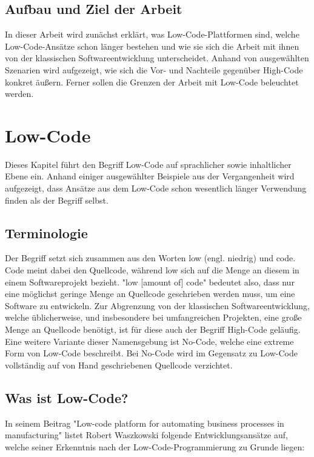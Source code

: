 \documentclass[acmtog, language=ngerman]{acmart}
\begin{document}
\subsection{Aufbau und Ziel der Arbeit}
In dieser Arbeit wird zunächst erklärt, was Low-Code-Plattformen sind, welche Low-Code-Ansätze schon länger bestehen und wie sie sich die Arbeit mit ihnen von der klassischen Softwareentwicklung unterscheidet. Anhand von ausgewählten Szenarien wird aufgezeigt, wie sich die Vor- und Nachteile gegenüber High-Code konkret äußern. Ferner sollen die Grenzen der Arbeit mit Low-Code beleuchtet werden. 

\section{Low-Code}
Dieses Kapitel führt den Begriff Low-Code auf sprachlicher sowie inhaltlicher Ebene ein. Anhand einiger ausgewählter Beispiele aus der Vergangenheit wird aufgezeigt, dass Ansätze aus dem Low-Code schon wesentlich länger Verwendung finden als der Begriff selbst.

\subsection{Terminologie}
Der Begriff setzt sich zusammen aus den Worten low (engl. niedrig) und code. Code meint dabei den Quellcode, während low sich auf die Menge an diesem in einem Softwareprojekt bezieht. "low [amount of] code" bedeutet also, dass nur eine möglichst geringe Menge an Quellcode geschrieben werden muss, um eine Software zu entwickeln. Zur Abgrenzung von der klassischen Softwareentwicklung, welche üblicherweise, und insbesondere bei umfangreichen Projekten, eine große Menge an Quellcode benötigt, ist für diese auch der Begriff High-Code geläufig. Eine weitere Variante dieser Namensgebung ist No-Code, welche eine extreme Form von Low-Code beschreibt. Bei No-Code wird im Gegensatz zu Low-Code vollständig auf von Hand geschriebenen Quellcode verzichtet. 

\subsection{Was ist Low-Code?} \label{sec:was_ist_low_code}
In seinem Beitrag "Low-code platform for automating business processes in manufacturing" listet Robert Waszkowski folgende Entwicklungsansätze auf, welche seiner Erkenntnis nach der Low-Code-Programmierung zu Grunde liegen:
\end{document}
